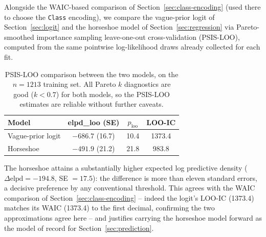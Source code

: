 Alongside the WAIC-based comparison of Section~\ref{sec:class-encoding} (used there to choose the
\texttt{Class} encoding), we compare the vague-prior logit of Section~\ref{sec:logit} and
the horseshoe model of Section~\ref{sec:regression} via Pareto-smoothed importance sampling
leave-one-out cross-validation (PSIS-LOO), computed from the same pointwise
log-likelihood draws already collected for each fit.

\begin{table}[h]
\small
\centering
\begin{tabular}{lccc}
\hline
Model & elpd\_loo (SE) & $p_{\text{loo}}$ & LOO-IC \\
\hline
Vague-prior logit & $-686.7$ (16.7) & 10.4 & 1373.4 \\
Horseshoe          & $-491.9$ (21.2) & 21.8 & 983.8 \\
\hline
\end{tabular}
\caption{PSIS-LOO comparison between the two models, on the $n=1213$
training set. All Pareto $k$ diagnostics are good ($k<0.7$) for both models,
so the PSIS-LOO estimates are reliable without further caveats.}
\end{table}

The horseshoe attains a substantially higher expected log predictive density
($\Delta\text{elpd} = -194.8$, SE $= 17.5$): the difference is more than eleven
standard errors, a decisive preference by any conventional threshold. This
agrees with the WAIC comparison of Section~\ref{sec:class-encoding} -- indeed the logit's LOO-IC
(1373.4) matches its WAIC (1373.4) to the first decimal, confirming the two
approximations agree here -- and justifies carrying the horseshoe
model forward as the model of record for Section~\ref{sec:prediction}.


